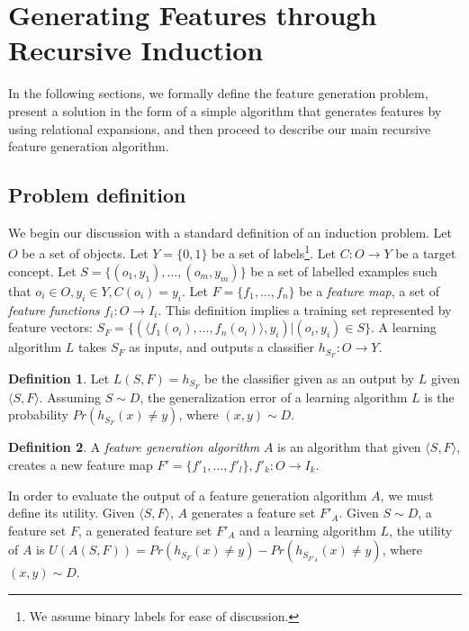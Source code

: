 \documentclass{article}
\theoremstyle{definition}
\newtheorem{defn}{Definition}[section]
\begin{document}
\section{Generating Features through Recursive Induction} \label{formal}

In the following sections, we formally define the feature generation problem, present a solution  in the form of a simple algorithm that generates features by using
relational expansions, and then proceed to describe our main recursive feature generation algorithm.

\subsection{Problem definition}

We begin our discussion with a standard definition of an induction problem. 
Let $O$ be a set of objects. Let $Y=\{0,1\}$ be a set of labels\footnote{We assume binary labels for ease of discussion.}. Let $C:O\rightarrow Y$ be a target concept. Let $S=\{(o_{1},y_{1}),\ldots,(o_{m},y_{m})\}$ be a set of labelled examples such that $o_{i}\in O, y_{i}\in Y, C(o_i)=y_i$. 
Let $F=\{f_{1},\ldots,f_{n}\}$ be a \emph{feature map}, a set of \emph{feature functions} $f_{i}:O\rightarrow I_{i}$.  This definition implies a training set represented by feature vectors: $S_F=\{ (\langle f_1(o_i),\ldots,f_n(o_i)\rangle, y_i) | (o_i,y_i) \in S\}$. A learning algorithm $L$ takes $S_F$ as inputs, and outputs a classifier $h_{S_F}:O\rightarrow Y$.
\begin{defn}
	Let $L(S,F)=h_{S_F}$ be the classifier given as an output by $L$ given $\langle S,F\rangle$. Assuming $S\sim D$, the generalization error of a learning algorithm $L$ is the probability $Pr(h_{S_F}(x)\neq y)$, where $(x,y)\sim D$.
\end{defn}

\begin{defn}
	A \emph{feature generation algorithm} $A$ is an algorithm that given $\langle S,F\rangle$, creates a new feature map $F'=\{f'_{1},\ldots,f'_{l}\}, f'_{k}:O\rightarrow I_k$.
\end{defn}

In order to evaluate the output of a feature generation algorithm $A$, we must define its utility. Given $\langle S,F \rangle$, $A$ generates a feature set $F'_A$.
Given $S\sim D$, a feature set $F$, a generated feature set $F'_A$ and a learning algorithm $L$, the utility of $A$ is $U(A(S,F))=Pr(h_{S_F}(x)\neq y)-Pr(h_{S_{F'_A}}(x)\neq y)$, where $(x,y)\sim D$.
\end{document}
